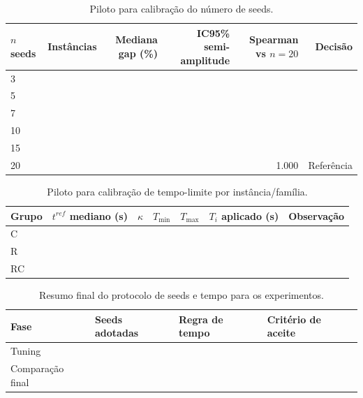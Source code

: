 \begin{table}[htbp]
\centering
\caption{Piloto para calibração do número de seeds.}
\label{tab:seed_calibration_template}
\begin{tabular}{lrrrrr}
\hline
$n$ seeds & Instâncias & Mediana gap (\%) & IC95\% semi-amplitude & Spearman vs $n=20$ & Decisão \\
\hline
3  &  &  &  &  &  \\
5  &  &  &  &  &  \\
7  &  &  &  &  &  \\
10 &  &  &  &  &  \\
15 &  &  &  &  &  \\
20 &  &  &  & 1.000 & Referência \\
\hline
\end{tabular}
\end{table}

\begin{table}[htbp]
\centering
\caption{Piloto para calibração de tempo-limite por instância/família.}
\label{tab:time_calibration_template}
\begin{tabular}{lrrrrrr}
\hline
Grupo & $t^{ref}$ mediano (s) & $\kappa$ & $T_{\min}$ & $T_{\max}$ & $T_i$ aplicado (s) & Observação \\
\hline
C  &  &  &  &  &  &  \\
R  &  &  &  &  &  &  \\
RC &  &  &  &  &  &  \\
\hline
\end{tabular}
\end{table}

\begin{table}[htbp]
\centering
\caption{Resumo final do protocolo de seeds e tempo para os experimentos.}
\label{tab:seed_time_final_protocol}
\begin{tabular}{llll}
\hline
Fase & Seeds adotadas & Regra de tempo & Critério de aceite \\
\hline
Tuning &  &  &  \\
Comparação final &  &  &  \\
\hline
\end{tabular}
\end{table}
